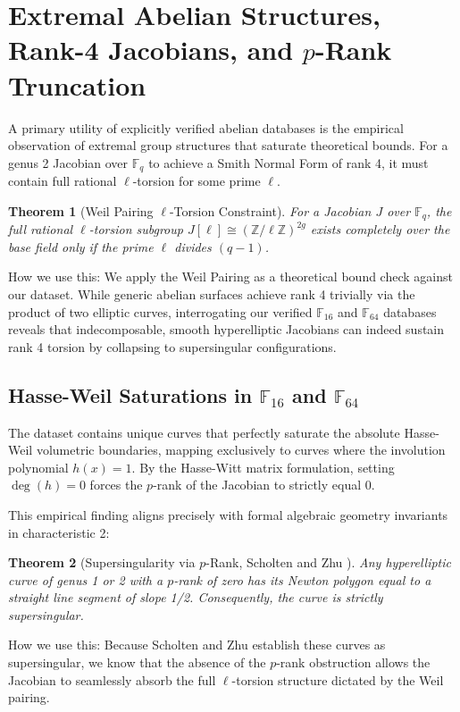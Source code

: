 \documentclass[letterpaper, 11pt]{article}
\newtheorem{theorem}{Theorem}[section]
\begin{document}
\section{Extremal Abelian Structures, Rank-4 Jacobians, and \texorpdfstring{$p$}{p}-Rank Truncation}
A primary utility of explicitly verified abelian databases is the empirical observation of extremal group structures that saturate theoretical bounds. For a genus 2 Jacobian over $\mathbb{F}_q$ to achieve a Smith Normal Form of rank 4, it must contain full rational $\ell$-torsion for some prime $\ell$.

\begin{theorem}[Weil Pairing $\ell$-Torsion Constraint]
For a Jacobian $J$ over $\mathbb{F}_q$, the full rational $\ell$-torsion subgroup $J[\ell] \cong (\mathbb{Z}/\ell\mathbb{Z})^{2g}$ exists completely over the base field only if the prime $\ell$ divides $(q-1)$.
\end{theorem}

How we use this: We apply the Weil Pairing as a theoretical bound check against our dataset. While generic abelian surfaces achieve rank 4 trivially via the product of two elliptic curves, interrogating our verified $\mathbb{F}_{16}$ and $\mathbb{F}_{64}$ databases reveals that indecomposable, smooth hyperelliptic Jacobians can indeed sustain rank 4 torsion by collapsing to supersingular configurations. 

\subsection{Hasse-Weil Saturations in \texorpdfstring{$\mathbb{F}_{16}$}{F\_16} and \texorpdfstring{$\mathbb{F}_{64}$}{F\_64}}
The dataset contains unique curves that perfectly saturate the absolute Hasse-Weil volumetric boundaries, mapping exclusively to curves where the involution polynomial $h(x) = 1$. By the Hasse-Witt matrix formulation, setting $\deg(h) = 0$ forces the $p$-rank of the Jacobian to strictly equal 0. 

This empirical finding aligns precisely with formal algebraic geometry invariants in characteristic 2:
\begin{theorem}[Supersingularity via $p$-Rank, Scholten and Zhu \cite{Scholten2002}]
Any hyperelliptic curve of genus 1 or 2 with a $p$-rank of zero has its Newton polygon equal to a straight line segment of slope 1/2. Consequently, the curve is strictly supersingular.
\end{theorem}

How we use this: Because Scholten and Zhu establish these curves as supersingular, we know that the absence of the $p$-rank obstruction allows the Jacobian to seamlessly absorb the full $\ell$-torsion structure dictated by the Weil pairing. 
\end{document}
